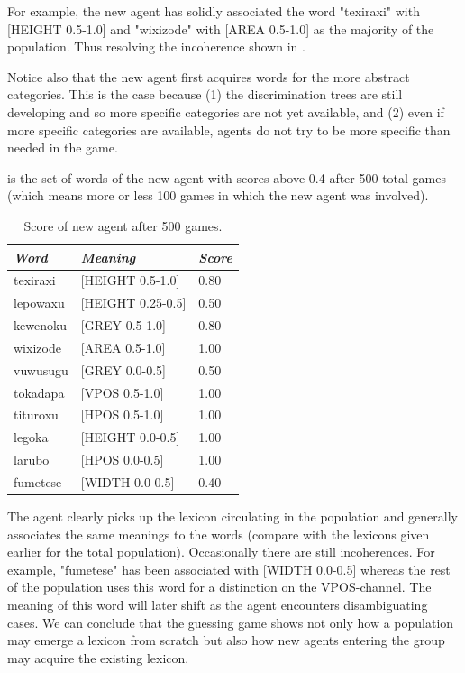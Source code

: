 For example, the new agent
has solidly associated the word "texiraxi" with 
[HEIGHT 0.5-1.0] and "wixizode" with [AREA 0.5-1.0]
as the majority of the population. Thus resolving the 
incoherence shown in . 

Notice also that the new agent first acquires words 
for the more abstract categories. This is the case 
because (1) the discrimination trees are still developing
and so more specific categories are not yet available, 
and (2) even if more specific categories are available, 
agents do not try to be more specific than needed in 
the game. 

 is the set of words of the new agent
with scores above 0.4 after 
500 total games (which means more or less 100 games 
in which the new agent was involved). 
\begin{table}
\begin{center}
\begin{tabular}{ l  l  l } \midrule
{\it Word} & {\it Meaning} & {\it Score} \\ \midrule
texiraxi &  [HEIGHT 0.5-1.0] & 0.80 \\ \midrule
lepowaxu &  [HEIGHT 0.25-0.5] & 0.50 \\ \midrule
kewenoku &  [GREY 0.5-1.0] & 0.80 \\ \midrule
wixizode & [AREA 0.5-1.0] & 1.00 \\ \midrule
vuwusugu & [GREY 0.0-0.5] & 0.50 \\ \midrule
tokadapa &  [VPOS 0.5-1.0] & 1.00 \\ \midrule
tituroxu &  [HPOS 0.5-1.0] & 1.00 \\ \midrule
legoka   &  [HEIGHT 0.0-0.5] & 1.00 \\ \midrule
larubo   &  [HPOS 0.0-0.5] & 1.00 \\ \midrule
fumetese &  [WIDTH 0.0-0.5] & 0.40 \\ \midrule
\end{tabular}
\caption{\label{tab:newagents} Score of new agent after 500 games.}
\end{center}
\end{table}
The agent clearly picks up the lexicon circulating
in the population and generally associates the 
same meanings to the words (compare with the 
lexicons given earlier for the total population). 
Occasionally there are still incoherences. For example, 
"fumetese" has been associated with [WIDTH 0.0-0.5] 
whereas the rest of the population uses this word
for a distinction on the VPOS-channel. The meaning
of this word will later shift as the agent encounters
disambiguating cases. We can conclude that the 
guessing game shows not only how a population may 
emerge a lexicon from scratch but also how new 
agents entering the group may acquire the existing 
lexicon.  

